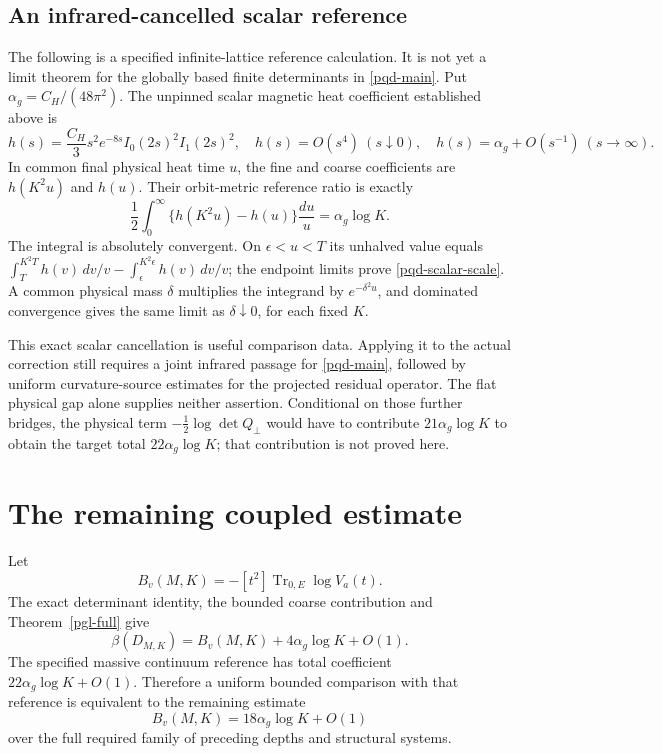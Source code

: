 \documentclass[11pt]{article}
\theoremstyle{remark}
\begin{document}
\subsection{An infrared-cancelled scalar reference}
\label{pqd-scalar-reference-section}

The following is a specified infinite-lattice reference calculation.
It is not yet a limit theorem for the globally based finite determinants
in \eqref{pqd-main}. Put $\alpha_g=C_H/(48\pi^2)$. The unpinned scalar
magnetic heat coefficient established above is
\begin{equation}
 h(s)=\frac{C_H}{3}s^2e^{-8s}I_0(2s)^2I_1(2s)^2,
 \quad h(s)=O(s^4)\ (s\downarrow0),\quad
 h(s)=\alpha_g+O(s^{-1})\ (s\to\infty).
 \label{pqd-scalar-heat}
\end{equation}
In common final physical heat time $u$, the fine and coarse coefficients
are $h(K^2u)$ and $h(u)$. Their orbit-metric reference ratio is exactly
\begin{equation}
 \frac12\int_0^\infty\{h(K^2u)-h(u)\}\frac{du}{u}
                       =\alpha_g\log K.
 \label{pqd-scalar-scale}
\end{equation}
The integral is absolutely convergent. On $\epsilon<u<T$ its unhalved
value equals
$\int_T^{K^2T}h(v)\,dv/v-\int_\epsilon^{K^2\epsilon}h(v)\,dv/v$;
the endpoint limits prove \eqref{pqd-scalar-scale}. A common physical
mass $\delta$ multiplies the integrand by $e^{-\delta^2u}$, and dominated
convergence gives the same limit as $\delta\downarrow0$, for each
fixed $K$.

This exact scalar cancellation is useful comparison data. Applying it
to the actual correction still requires a joint infrared passage for
\eqref{pqd-main}, followed by uniform curvature-source estimates for the
projected residual operator. The flat physical gap alone supplies
neither assertion. Conditional on those further bridges, the physical
term $-\frac12\log\det Q_\perp$ would have to contribute
$21\alpha_g\log K$ to obtain the target total
$22\alpha_g\log K$; that contribution is not proved here.



\section{The remaining coupled estimate}

Let
\[
 B_v(M,K)=-[t^2]\operatorname{Tr}_{0,E}\log V_a(t).
\]
The exact determinant identity, the bounded coarse
contribution and Theorem~\ref{pgl-full} give
\[
 \beta(D_{M,K})=B_v(M,K)+4\alpha_g\log K+O(1).
\]
The specified massive continuum reference has total
coefficient \(22\alpha_g\log K+O(1)\).
Therefore a uniform bounded comparison with that
reference is equivalent to the remaining estimate
\[
                  B_v(M,K)=18\alpha_g\log K+O(1)
\]
over the full required family of preceding depths and
structural systems.
\end{document}
